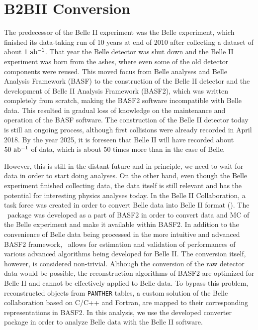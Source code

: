 \chapter{B2BII Conversion}
The predecessor of the Belle II experiment was the Belle experiment, which finished its data-taking run of 10 years at end of 2010 after collecting a dataset of about $1\mathrm{~ab^{-1}}$. That year the Belle detector was shut down and the Belle II experiment was born from the ashes, where even some of the old detector components were reused. This moved focus from Belle analyses and Belle Analysis Framework (BASF) to the construction of the Belle II detector and the development of Belle II Analysis Framework (BASF2), which was written completely from scratch, making the BASF2 software incompatible with Belle data. This resulted in gradual loss of knowledge on the maintenance and operation of the BASF software. The construction of the Belle II detector today is still an ongoing process, although first collisions were already recorded in April 2018. By the year 2025, it is foreseen that Belle II will have recorded about $50\mathrm{~ab^{-1}}$ of data, which is about $50$ times more than in the case of Belle. 

However, this is still in the distant future and in principle, we need to wait for data in order to start doing analyses. On the other hand, even though the Belle experiment finished collecting data, the data itself is still relevant and has the potential for interesting physics analyses today. In the Belle II Collaboration, a task force was created in order to convert Belle data into Belle II format (\btbii). The \btbii~package was developed as a part of BASF2 in order to convert data and MC of the Belle experiment and make it available within BASF2. In addition to the convenience of Belle data being processed in the more intuitive and advanced BASF2 framework, \btbii~allows for estimation and validation of performances of various advanced algorithms being developed for Belle II. The conversion itself, however, is considered non-trivial. Although the conversion of the raw detector data would be possible, the reconstruction algorithms of BASF2 are optimized for Belle II and cannot be effectively applied to Belle data. To bypass this problem, reconstructed objects from \texttt{PANTHER} tables, a custom solution of the Belle collaboration based on C/C++ and Fortran, are mapped to their corresponding representations in BASF2. In this analysis, we use the developed converter package in order to analyze Belle data with the Belle II software.

